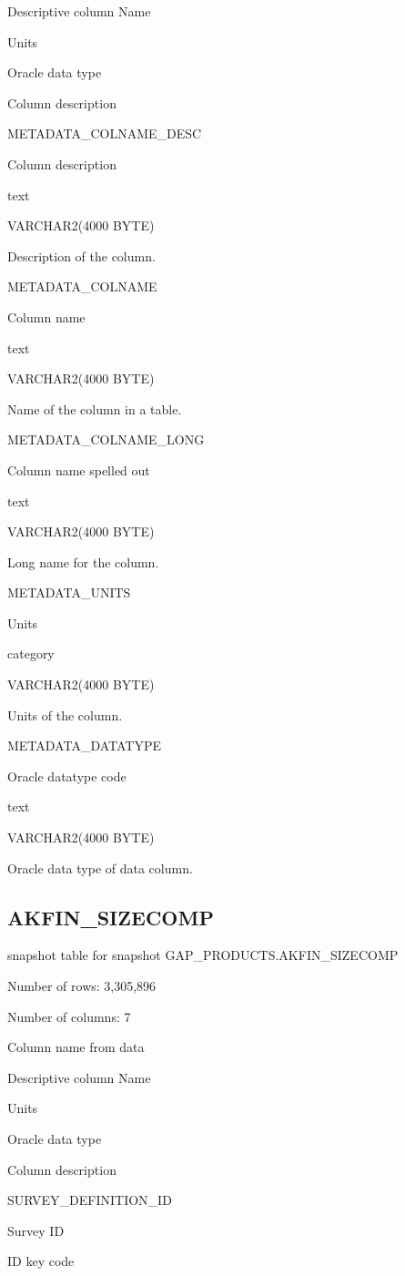 \documentclass[
  letterpaper,
  oneside,
  open=any]{scrbook}
\begin{document}
Descriptive column Name

Units

Oracle data type

Column description

METADATA\_COLNAME\_DESC

Column description

text

VARCHAR2(4000 BYTE)

Description of the column.

METADATA\_COLNAME

Column name

text

VARCHAR2(4000 BYTE)

Name of the column in a table.

METADATA\_COLNAME\_LONG

Column name spelled out

text

VARCHAR2(4000 BYTE)

Long name for the column.

METADATA\_UNITS

Units

category

VARCHAR2(4000 BYTE)

Units of the column.

METADATA\_DATATYPE

Oracle datatype code

text

VARCHAR2(4000 BYTE)

Oracle data type of data column.

\subsection{AKFIN\_SIZECOMP}\label{akfin_sizecomp}

snapshot table for snapshot GAP\_PRODUCTS.AKFIN\_SIZECOMP

Number of rows: 3,305,896

Number of columns: 7

Column name from data

Descriptive column Name

Units

Oracle data type

Column description

SURVEY\_DEFINITION\_ID

Survey ID

ID key code
\end{document}
